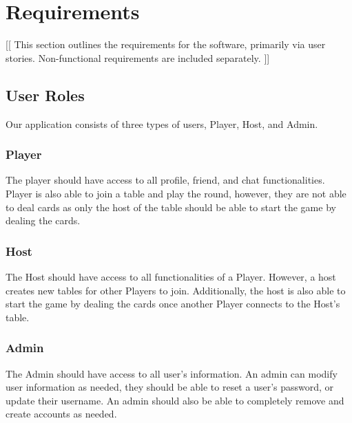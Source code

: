 \section{Requirements}


[[
This section outlines the requirements for the software, primarily via user
stories. 
 Non-functional requirements are included separately.
]]


\subsection{User Roles}


Our application consists of three types of users, Player, Host, and Admin. 


\subsubsection{Player}
The player should have access to all profile, friend, and chat functionalities.
Player is also able to join a table and play the round, however, they are not able to deal cards as only the host of the table should be able to start the game by dealing the cards. 

\subsubsection{Host}
The Host should have access to all functionalities of a Player. However, a host creates new tables for other Players to join. Additionally, the host is also able to start the game by dealing the cards once another Player connects to the Host's table. 

\subsubsection{Admin}
The Admin should have access to all user's information. An admin can modify user information as needed, they should be able to reset a user's password, or update their username. An admin should also be able to completely remove and create accounts as needed. 


